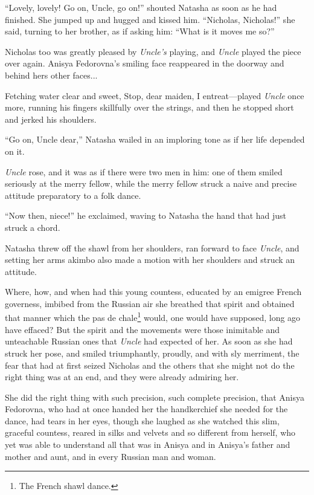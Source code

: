 ``Lovely, lovely! Go on, Uncle, go on!'' shouted Natasha as soon
as he had finished. She jumped up and hugged and kissed
him. ``Nicholas, Nicholas!''  she said, turning to her brother,
as if asking him: ``What is it moves me so?''

Nicholas too was greatly pleased by \emph{Uncle's} playing, and
\emph{Uncle} played the piece over again. Anisya Fedorovna's
smiling face reappeared in the doorway and behind hers other
faces...

Fetching water clear and sweet, Stop, dear maiden, I
entreat---played \emph{Uncle} once more, running his fingers
skillfully over the strings, and then he stopped short and jerked
his shoulders.

``Go on, Uncle dear,'' Natasha wailed in an imploring tone as if
her life depended on it.

\emph{Uncle} rose, and it was as if there were two men in him:
one of them smiled seriously at the merry fellow, while the merry
fellow struck a naive and precise attitude preparatory to a folk
dance.

``Now then, niece!'' he exclaimed, waving to Natasha the hand
that had just struck a chord.

Natasha threw off the shawl from her shoulders, ran forward to
face \emph{Uncle}, and setting her arms akimbo also made a motion
with her shoulders and struck an attitude.

Where, how, and when had this young countess, educated by an
emigree French governess, imbibed from the Russian air she
breathed that spirit and obtained that manner which the pas de
chale\footnote{The French shawl dance.} would, one would have
supposed, long ago have effaced? But the spirit and the movements
were those inimitable and unteachable Russian ones that
\emph{Uncle} had expected of her. As soon as she had struck her
pose, and smiled triumphantly, proudly, and with sly merriment,
the fear that had at first seized Nicholas and the others that
she might not do the right thing was at an end, and they were
already admiring her.

She did the right thing with such precision, such complete
precision, that Anisya Fedorovna, who had at once handed her the
handkerchief she needed for the dance, had tears in her eyes,
though she laughed as she watched this slim, graceful countess,
reared in silks and velvets and so different from herself, who
yet was able to understand all that was in Anisya and in Anisya's
father and mother and aunt, and in every Russian man and woman.


